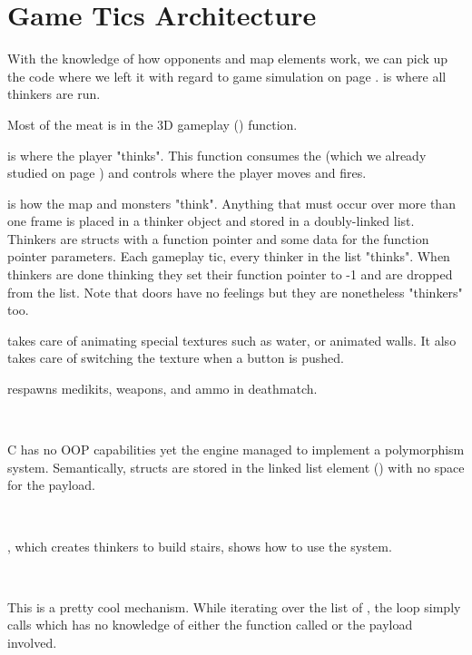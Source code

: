 \section{Game Tics Architecture}
With the knowledge of how opponents and map elements work, we can pick up the code where we left it with regard to game simulation on page \pageref{TryRunTics.c}.  is where all thinkers are run.\\
\par
{}
\par
Most of the meat is in the 3D gameplay () function.\\
\par
{}
\par
{} is where the player "thinks". This function consumes the  (which we already studied on page \pageref{cmd_t_type}) and controls where the player moves and fires.\\
\par 
{} is how the map and monsters "think". Anything that must occur over more than one frame is placed in a thinker object and stored in a doubly-linked list. Thinkers are structs with a function pointer and some data for the function pointer parameters. Each gameplay tic, every thinker in the list "thinks". When thinkers are done thinking they set their function pointer to -1 and are dropped from the list. Note that doors have no feelings but they are nonetheless "thinkers" too.\\
\par
{} takes care of animating special textures such as water, or animated walls. It also takes care of switching the texture when a button is pushed.\\
\par 

  respawns medikits, weapons, and ammo in deathmatch.



\\
\par
C has no OOP capabilities yet the engine managed to implement a polymorphism system. Semantically,  structs are stored in the linked list element () with no space for the payload. \\%
\par
{}\\
\par
{}, which creates thinkers to build stairs, shows how to use the system.\\
\par
{}\\
\par
This is a pretty cool mechanism. While iterating over the list of , the loop simply calls  which has no knowledge of either the function called or the payload involved.
